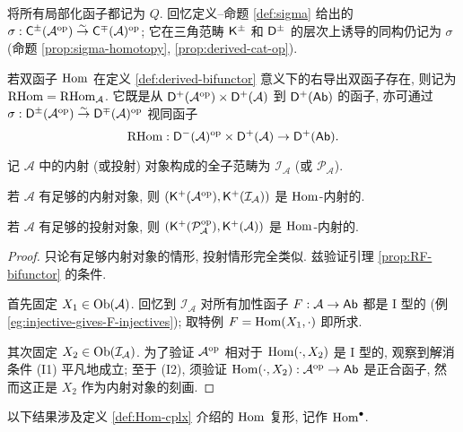 将所有局部化函子都记为 $Q$. 回忆定义--命题 \ref{def:sigma} 给出的 $\sigma: \mathsf{C}^\pm(\mathcal{A}^{\operatorname{op}}) \stackrel{\sim}{\rightarrow} \mathsf{C}^{\mp}(\mathcal{A})^{\operatorname{op}}$; 它在三角范畴 $\mathsf{K}^\pm$ 和 $\mathsf{D}^{\pm}$ 的层次上诱导的同构仍记为 $\sigma$ (命题 \ref{prop:sigma-homotopy}, \ref{prop:derived-cat-op}).

\begin{definition}
	若双函子 $\operatorname{Hom}$ 在定义 \ref{def:derived-bifunctor} 意义下的右导出双函子存在, 则记为 $\operatorname{RHom} = \operatorname{RHom}_{\mathcal{A}}$. 它既是从 $\mathsf{D}^+(\mathcal{A}^{\operatorname{op}}) \times \mathsf{D}^+(\mathcal{A})$ 到 $\mathsf{D}^+(\mathsf{Ab})$ 的函子, 亦可通过 $\sigma: \mathsf{D}^{\pm}(\mathcal{A}^{\operatorname{op}}) \stackrel{\sim}{\rightarrow} \mathsf{D}^{\mp}(\mathcal{A})^{\operatorname{op}}$ 视同函子
	\[ \operatorname{RHom}: \mathsf{D}^-(\mathcal{A})^{\operatorname{op}} \times \mathsf{D}^+(\mathcal{A}) \to \mathsf{D}^+(\mathsf{Ab}). \]
\end{definition}

\begin{lemma}\label{prop:RHom-bounded-prep}
	记 $\mathcal{A}$ 中的内射 (或投射) 对象构成的全子范畴为 $\mathcal{I}_{\mathcal{A}}$ (或 $\mathcal{P}_{\mathcal{A}}$).
	\begin{compactitem}
		\item 若 $\mathcal{A}$ 有足够的内射对象, 则 $(\mathsf{K}^+(\mathcal{A}^{\operatorname{op}}), \mathsf{K}^+(\mathcal{I}_{\mathcal{A}}))$ 是 $\operatorname{Hom}$-内射的.
		\item 若 $\mathcal{A}$ 有足够的投射对象, 则 $(\mathsf{K}^+(\mathcal{\mathcal{P}_{\mathcal{A}}^{\operatorname{op}}}), \mathsf{K}^+(\mathcal{A}))$ 是 $\operatorname{Hom}$-内射的.
	\end{compactitem}
\end{lemma}
\begin{proof}
	只论有足够内射对象的情形, 投射情形完全类似. 兹验证引理 \ref{prop:RF-bifunctor} 的条件.
	
	首先固定 $X_1 \in \operatorname{Ob}(\mathcal{A})$. 回忆到 $\mathcal{I}_{\mathcal{A}}$ 对所有加性函子 $F: \mathcal{A} \to \mathsf{Ab}$ 都是 I 型的 (例 \ref{eg:injective-gives-F-injectives}); 取特例 $F = \operatorname{Hom}(X_1, \cdot)$ 即所求.
	
	其次固定 $X_2 \in \operatorname{Ob}(\mathcal{I}_{\mathcal{A}})$. 为了验证 $\mathcal{A}^{\operatorname{op}}$ 相对于 $\operatorname{Hom}(\cdot, X_2)$ 是 I 型的, 观察到解消条件 (I1) 平凡地成立; 至于 (I2), 须验证 $\operatorname{Hom}(\cdot, X_2): \mathcal{A}^{\operatorname{op}} \to \mathsf{Ab}$ 是正合函子, 然而这正是 $X_2$ 作为内射对象的刻画.
\end{proof}

以下结果涉及定义 \ref{def:Hom-cplx} 介绍的 $\operatorname{Hom}$ 复形, 记作 $\operatorname{Hom}^\bullet$.

